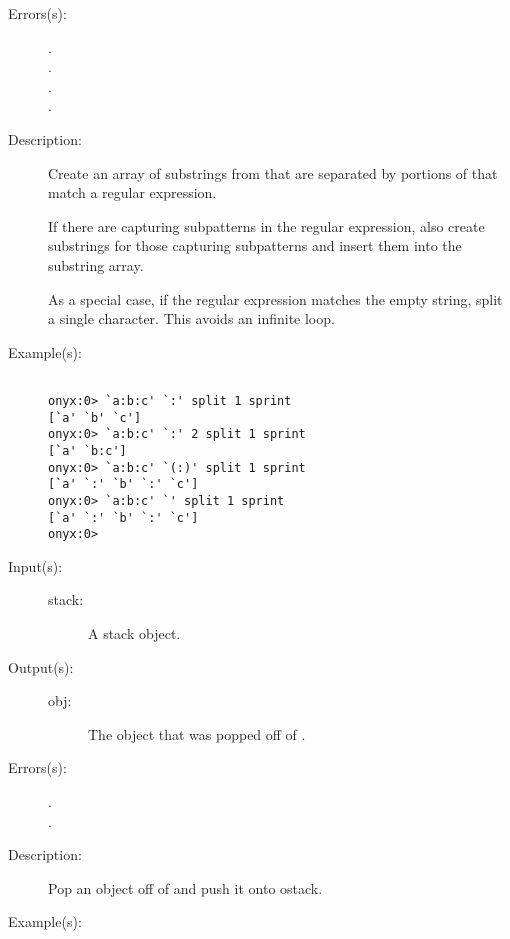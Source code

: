\begin{description}
\begin{description}
	\item[Errors(s): ]
		\begin{description}\item[]
		\item[.]
		\item[.]
		\item[.]
		\item[.]
		\end{description}
	\item[Description: ]
		Create an array of substrings from  that are
		separated by portions of  that match a regular
		expression.

		If there are capturing subpatterns in the regular expression,
		also create substrings for those capturing subpatterns and
		insert them into the substring array.

		As a special case, if the regular expression matches the empty
		string, split a single character.  This avoids an infinite
		loop.
	\item[Example(s): ]\begin{verbatim}

onyx:0> `a:b:c' `:' split 1 sprint
[`a' `b' `c']
onyx:0> `a:b:c' `:' 2 split 1 sprint
[`a' `b:c']
onyx:0> `a:b:c' `(:)' split 1 sprint
[`a' `:' `b' `:' `c']
onyx:0> `a:b:c' `' split 1 sprint
[`a' `:' `b' `:' `c']
onyx:0>
		\end{verbatim}
	\end{description}
\label{systemdict:spop}
\item[{\onyxop{stack}{spop}{obj}}: ]
	\begin{description}\item[]
	\item[Input(s): ]
		\begin{description}\item[]
		\item[stack: ]
			A stack object.
		\end{description}
	\item[Output(s): ]
		\begin{description}\item[]
		\item[obj: ]
			The object that was popped off of .
		\end{description}
	\item[Errors(s): ]
		\begin{description}\item[]
		\item[.]
		\item[.]
		\end{description}
	\item[Description: ]
		Pop an object off of  and push it onto ostack.
	\item[Example(s): ]\begin{verbatim}


\end{verbatim}
\end{description}
\end{description}
